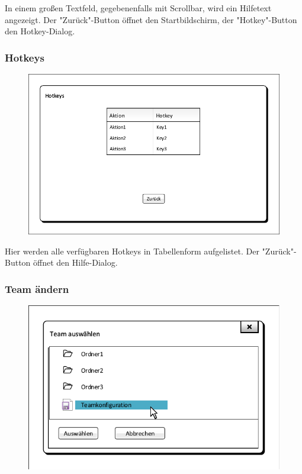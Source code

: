 In einem großen Textfeld, gegebenenfalls mit Scrollbar, wird ein Hilfetext angezeigt. Der "Zurück"-Button öffnet den Startbildschirm, der "Hotkey"-Button den Hotkey-Dialog.

\subsubsection{Hotkeys}
\begin{figure}[H]
	\centering
	\includegraphics[scale=0.8]{images/Hotkeys.pdf}
\end{figure}

Hier werden alle verfügbaren Hotkeys in Tabellenform aufgelistet. Der "Zurück"-Button öffnet den Hilfe-Dialog.

\subsubsection{Team ändern}
\begin{figure}[H]
	\centering
	\includegraphics[scale=0.8]{images/Teamauswahl_Popup.pdf}
\end{figure}


